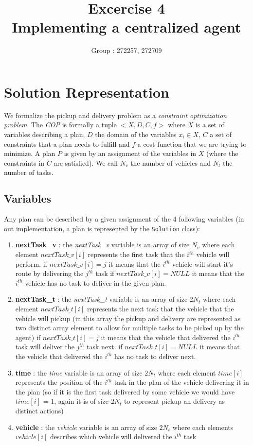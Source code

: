 \documentclass[11pt]{article}
\title{\bf Excercise 4\\ Implementing a centralized agent}
\author{Group \textnumero : 272257, 272709}
\begin{document}
\maketitle

\section{Solution Representation}

We formalize the pickup and delivery problem as a \textit{constraint optimization problem}. The \textit{COP} is formally a tuple $< X, D, C, f >$ where $X$ is a set of variables describing a plan, $D$ the domain of the variables $x_i \in X$, $C$ a set of constraints that a plan needs to fulfill and $f$ a cost function that we are trying to minimize. A plan $P$ is given by an assignment of the variables in $X$ (where the constraints in $C$ are satisfied). We call $N_v$ the number of vehicles and $N_t$ the number of tasks.


\subsection{Variables}
Any plan can be described by a given assignment of the 4 following variables (in out implementation, a plan is represented by the \texttt{Solution} class):
\begin{enumerate}
    \item \textbf{nextTask\_v} : the \textit{nextTask\_v} variable is an array of size $N_v$ where each element $nextTask\_v[i]$ represents the first task that the $i^{th}$ vehicle will perform.
    \subitem if $nextTask\_v[i] = j$ it means that the $i^{th}$ vehicle will start it's route by delivering the $j^{th}$ task
    \subitem if $nextTask\_v[i] = NULL$  it means that the $i^{th}$ vehicle has no task to deliver in the given plan.
    \item \textbf{nextTask\_t} : the \textit{nextTask\_t} variable is an array of size $2 N_t$ where each element $nextTask\_t[i]$ represents the next task that the vehicle that the vehicle will pickup (in this array the pickup and delivery are represented as two distinct array element to allow for multiple tasks to be picked up by the agent)
    \subitem if $nextTask\_t[i] = j$ it means that the vehicle that delivered the $i^{th}$ task will deliver the $j^{th}$ task next.
    \subitem if $nextTask\_t[i] = NULL$  it means that the vehicle that delivered the $i^{th}$ has no task to deliver next.
    \item \textbf{time} : the \textit{time} variable is an array of size $2  N_t$ where each element $time[i]$ represents the position of the $i^{th}$ task in the plan of the vehicle delivering it in the plan (so if it is the first task delivered by some vehicle we would have $time[i]$ = 1, again it is of size $2  N_t$ to represent pickup an delivery as distinct actions)
    \item \textbf{vehicle} : the \textit{vehicle} variable is an array of size $2N_t$ where each elements $vehicle[i]$ describes which vehicle will delivered the $i^{th}$ task
\end{enumerate}
\end{document}

